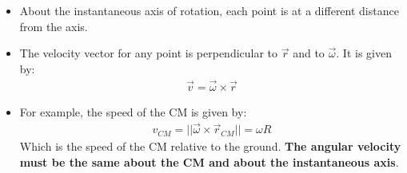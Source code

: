 \documentclass[aspectratio=169,
hyperref={colorlinks,urlcolor=blue}
]{beamer}
\begin{document}
{
\begin{itemize}
\item About the instantaneous axis of rotation, each point is at a different distance from the axis.
\item The velocity vector for any point is perpendicular to $\vec r$ and to $\vec \omega$. It is given by:
\begin{align*}
\vec v =\vec \omega \times \vec r
\end{align*}
\item For example, the speed of the CM is given by:
\begin{align*}
v_{CM}=||\vec \omega \times \vec r_{CM}||=\omega R
\end{align*}
Which is the speed of the CM relative to the ground. \textbf{The angular velocity must be the same about the CM and about the instantaneous axis}.
\end{itemize}
}
\end{document}
